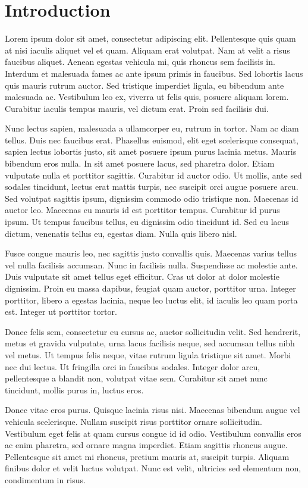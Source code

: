 \documentclass{UoYCSproject}
\begin{document}
\chapter{Introduction}
\label{cha:Introduction}
Lorem ipsum dolor sit amet, consectetur adipiscing elit. Pellentesque quis quam at nisi iaculis aliquet vel et quam. Aliquam erat volutpat. Nam at velit a risus faucibus aliquet. Aenean egestas vehicula mi, quis rhoncus sem facilisis in. Interdum et malesuada fames ac ante ipsum primis in faucibus. Sed lobortis lacus quis mauris rutrum auctor. Sed tristique imperdiet ligula, eu bibendum ante malesuada ac. Vestibulum leo ex, viverra ut felis quis, posuere aliquam lorem. Curabitur iaculis tempus mauris, vel dictum erat. Proin sed facilisis dui.

Nunc lectus sapien, malesuada a ullamcorper eu, rutrum in tortor. Nam ac diam tellus. Duis nec faucibus erat. Phasellus euismod, elit eget scelerisque consequat, sapien lectus lobortis justo, sit amet posuere ipsum purus lacinia metus. Mauris bibendum eros nulla. In sit amet posuere lacus, sed pharetra dolor. Etiam vulputate nulla et porttitor sagittis. Curabitur id auctor odio. Ut mollis, ante sed sodales tincidunt, lectus erat mattis turpis, nec suscipit orci augue posuere arcu. Sed volutpat sagittis ipsum, dignissim commodo odio tristique non. Maecenas id auctor leo. Maecenas eu mauris id est porttitor tempus. Curabitur id purus ipsum. Ut tempus faucibus tellus, eu dignissim odio tincidunt id. Sed eu lacus dictum, venenatis tellus eu, egestas diam. Nulla quis libero nisl.

Fusce congue mauris leo, nec sagittis justo convallis quis. Maecenas varius tellus vel nulla facilisis accumsan. Nunc in facilisis nulla. Suspendisse ac molestie ante. Duis vulputate sit amet tellus eget efficitur. Cras ut dolor at dolor molestie dignissim. Proin eu massa dapibus, feugiat quam auctor, porttitor urna. Integer porttitor, libero a egestas lacinia, neque leo luctus elit, id iaculis leo quam porta est. Integer ut porttitor tortor.

Donec felis sem, consectetur eu cursus ac, auctor sollicitudin velit. Sed hendrerit, metus et gravida vulputate, urna lacus facilisis neque, sed accumsan tellus nibh vel metus. Ut tempus felis neque, vitae rutrum ligula tristique sit amet. Morbi nec dui lectus. Ut fringilla orci in faucibus sodales. Integer dolor arcu, pellentesque a blandit non, volutpat vitae sem. Curabitur sit amet nunc tincidunt, mollis purus in, luctus eros.

Donec vitae eros purus. Quisque lacinia risus nisi. Maecenas bibendum augue vel vehicula scelerisque. Nullam suscipit risus porttitor ornare sollicitudin. Vestibulum eget felis at quam cursus congue id id odio. Vestibulum convallis eros ac enim pharetra, sed ornare magna imperdiet. Etiam sagittis rhoncus augue. Pellentesque sit amet mi rhoncus, pretium mauris at, suscipit turpis. Aliquam finibus dolor et velit luctus volutpat. Nunc est velit, ultricies sed elementum non, condimentum in risus.
\end{document}
